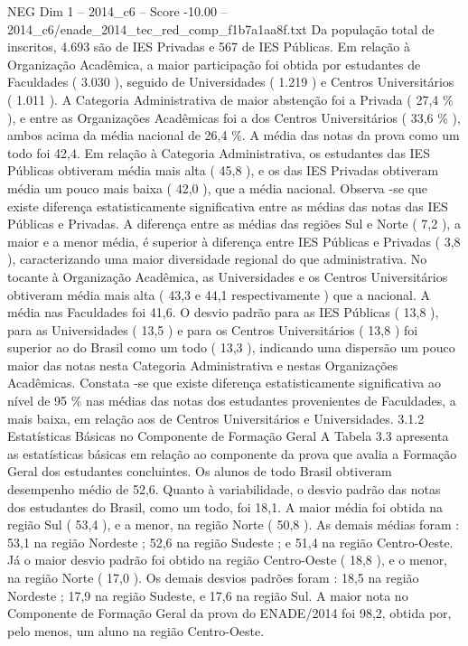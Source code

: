 \begin{textsample}{NEG Dim 1 – 2014\_c6 – Score -10.00 – 2014\_c6/enade\_2014\_tec\_red\_comp\_f1b7a1aa8f.txt}
Da população total de inscritos, 4.693 são de IES Privadas e 567 de IES Públicas.
Em relação à Organização Acadêmica, a maior participação foi obtida por estudantes de Faculdades ( 3.030 ), seguido de Universidades ( 1.219 ) e Centros Universitários ( 1.011 ).
A Categoria Administrativa de maior abstenção foi a Privada ( 27,4 \% ), e entre as Organizações Acadêmicas foi a dos Centros Universitários ( 33,6 \% ), ambos acima da média nacional de 26,4 \%.
A média das notas da prova como um todo foi 42,4.
Em relação à Categoria Administrativa, os estudantes das IES Públicas obtiveram média mais alta ( 45,8 ), e os das IES Privadas obtiveram média um pouco mais baixa ( 42,0 ), que a média nacional.
Observa -se que existe diferença estatisticamente significativa entre as médias das notas das IES Públicas e Privadas.
A diferença entre as médias das regiões Sul e Norte ( 7,2 ), a maior e a menor média, é superior à diferença entre IES Públicas e Privadas ( 3,8 ), caracterizando uma maior diversidade regional do que administrativa.
No tocante à Organização Acadêmica, as Universidades e os Centros Universitários obtiveram média mais alta ( 43,3 e 44,1 respectivamente ) que a nacional.
A média nas Faculdades foi 41,6.
O desvio padrão para as IES Públicas ( 13,8 ), para as Universidades ( 13,5 ) e para os Centros Universitários ( 13,8 ) foi superior ao do Brasil como um todo ( 13,3 ), indicando uma dispersão um pouco maior das notas nesta Categoria Administrativa e nestas Organizações Acadêmicas.
Constata -se que existe diferença estatisticamente significativa ao nível de 95 \% nas médias das notas dos estudantes provenientes de Faculdades, a mais baixa, em relação aos de Centros Universitários e Universidades. 3.1.2 Estatísticas Básicas no Componente de Formação Geral A Tabela 3.3 apresenta as estatísticas básicas em relação ao componente da prova que avalia a Formação Geral dos estudantes concluintes.
Os alunos de todo Brasil obtiveram desempenho médio de 52,6.
Quanto à variabilidade, o desvio padrão das notas dos estudantes do Brasil, como um todo, foi 18,1.
A maior média foi obtida na região Sul ( 53,4 ), e a menor, na região Norte ( 50,8 ).
As demais médias foram : 53,1 na região Nordeste ; 52,6 na região Sudeste ; e 51,4 na região Centro-Oeste.
Já o maior desvio padrão foi obtido na região Centro-Oeste ( 18,8 ), e o menor, na região Norte ( 17,0 ).
Os demais desvios padrões foram : 18,5 na região Nordeste ; 17,9 na região Sudeste, e 17,6 na região Sul.
A maior nota no Componente de Formação Geral da prova do ENADE/2014 foi 98,2, obtida por, pelo menos, um aluno na região Centro-Oeste.

\end{textsample}
